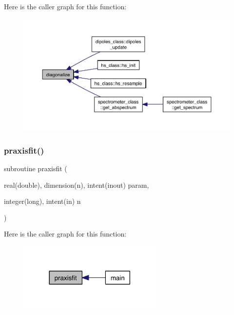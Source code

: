 Here is the caller graph for this function\+:\nopagebreak
\begin{figure}[H]
\begin{center}
\leavevmode
\includegraphics[width=350pt]{subroutines_8f90_a50a3911748dbb5647bf6be5043e905e1_icgraph}
\end{center}
\end{figure}
\mbox{\label{subroutines_8f90_a66d629a9efd7144f6d03009c5cae7c0d}} 
\subsubsection{\texorpdfstring{praxisfit()}{praxisfit()}}
{\footnotesize\ttfamily subroutine praxisfit (\begin{DoxyParamCaption}\item[{real(double), dimension(n), intent(inout)}]{param,  }\item[{integer(long), intent(in)}]{n }\end{DoxyParamCaption})}

Here is the caller graph for this function\+:\nopagebreak
\begin{figure}[H]
\begin{center}
\leavevmode
\includegraphics[width=204pt]{subroutines_8f90_a66d629a9efd7144f6d03009c5cae7c0d_icgraph}
\end{center}
\end{figure}
